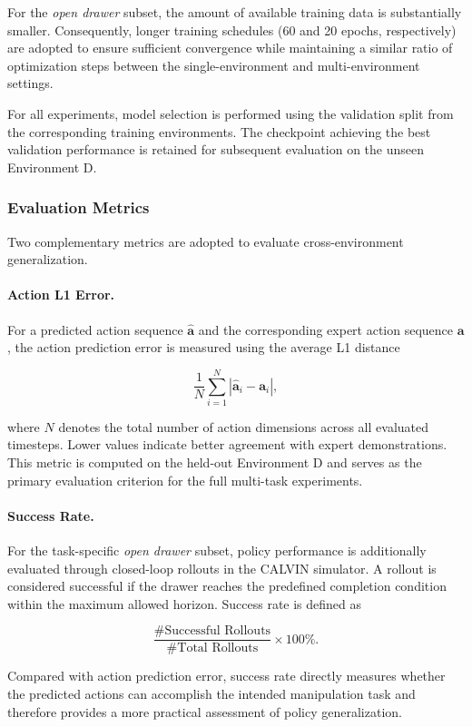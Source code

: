 For the \textit{open drawer} subset, the amount of available training data is substantially smaller. Consequently, longer training schedules (60 and 20 epochs, respectively) are adopted to ensure sufficient convergence while maintaining a similar ratio of optimization steps between the single-environment and multi-environment settings.

For all experiments, model selection is performed using the validation split from the corresponding training environments. The checkpoint achieving the best validation performance is retained for subsequent evaluation on the unseen Environment D.

\subsubsection{Evaluation Metrics}

Two complementary metrics are adopted to evaluate cross-environment generalization.

\paragraph{Action L1 Error.}
For a predicted action sequence $\hat{\mathbf{a}}$ and the corresponding expert action sequence $\mathbf{a}$, the action prediction error is measured using the average L1 distance

\[
\frac{1}{N}
\sum_{i=1}^{N}
\left|
\hat{\mathbf{a}}_i-\mathbf{a}_i
\right|,
\]

where $N$ denotes the total number of action dimensions across all evaluated timesteps. Lower values indicate better agreement with expert demonstrations. This metric is computed on the held-out Environment D and serves as the primary evaluation criterion for the full multi-task experiments.

\paragraph{Success Rate.}
For the task-specific \textit{open drawer} subset, policy performance is additionally evaluated through closed-loop rollouts in the CALVIN simulator. A rollout is considered successful if the drawer reaches the predefined completion condition within the maximum allowed horizon. Success rate is defined as

\[
\frac{\#\text{Successful Rollouts}}
{\#\text{Total Rollouts}}
\times 100\%.
\]

Compared with action prediction error, success rate directly measures whether the predicted actions can accomplish the intended manipulation task and therefore provides a more practical assessment of policy generalization.


